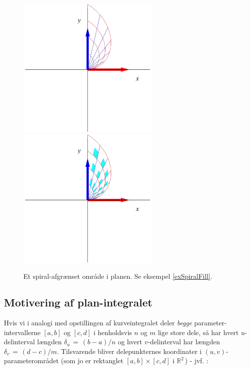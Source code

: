 \begin{figure}[ht]
\centerline{\includegraphics[height=70mm]{FIGS/plotSpiralFill}\,\,\, \includegraphics[height=70mm]{FIGS/plotSpiralFillApproks}}
\begin{center}
\caption{\small{Et spiral-afgrænset område i planen. Se
eksempel \ref{exSpiralFill}. }} \label{figSpiralFill}
\end{center}
\end{figure}




\subsection{Motivering af plan-integralet} \label{secMotivPlanInt}

Hvis vi i analogi med opstillingen af kurveintegralet deler {\em begge}
parameter-intervallerne $[a, b]$ og
 $[c, d]$ i henholdsvis $n$ og $m$
lige store dele, så har hvert $u$-delinterval længden $\delta_{u} \,
= \, (b-a)/n$ og hvert $v$-delinterval har længden $\delta_{v} \, =
\, (d-c)/m$. Tilsvarende bliver delepunkternes koordinater i $(u,
v)$-parameterområdet (som jo er rektanglet $[a,b]\times[c,d]$ i
$\mathbb{R}^{2}\,$) - jvf. :

